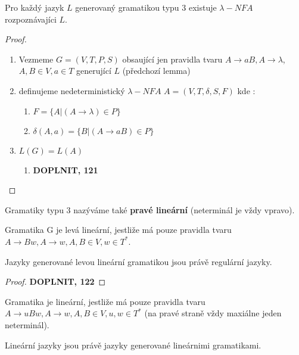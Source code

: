 \documentclass[../main.tex]{subfiles}
\begin{document}
\begin{theorem}
    Pro každý jazyk $L$ generovaný gramatikou typu 3 existuje $\lambda-NFA$ rozpoznávajíci $L$.
\end{theorem}
\begin{proof}
    \begin{enumerate}
        \item Vezmeme $G = (V,T,P,S)$ obsaující jen pravidla tvaru $A\rightarrow aB, A \rightarrow \lambda$,
        $A,B \in V, a\in T$ generující $L$ (předchozí lemma)
        \item definujeme nedeterministický $\lambda-NFA$ $A = (V,T,\delta, S, F)$ kde :
        \begin{enumerate}
            \item $F = \{A | (A\rightarrow \lambda) \in P\}$
            \item $\delta(A,a) = \{B | (A \rightarrow aB) \in P\}$
        \end{enumerate}
        \item $L(G) = L(A)$
        \begin{enumerate}
            \item \textbf{DOPLNIT, 121}
        \end{enumerate}
    \end{enumerate}
\end{proof}

\begin{definition}
    Gramatiky typu 3 nazýváme také \textbf{pravé lineární} (neterminál je vždy vpravo).

    Gramatika G je levá lineární, jestliže má pouze pravidla tvaru $A \rightarrow Bw, A \rightarrow w, A,B\in V, w\in T^*$.
\end{definition}

\begin{theorem}
    Jazyky generované levou lineární gramatikou jsou právě regulární jazyky.
\end{theorem}
\begin{proof}
    \textbf{DOPLNIT, 122}
\end{proof}

\begin{definition}
    Gramatika je lineární, jestliže má pouze pravidla tvaru $A \rightarrow uBw, A \rightarrow w, A,B \in V, u, w \in T^*$ (na pravé straně vždy maxiálne jeden neterminál).

    Lineární jazyky jsou právě jazyky generované lineárnimi gramatikami.
\end{definition}
\end{document}
